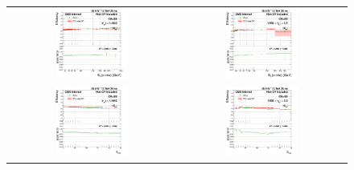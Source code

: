 \begin{figure}[bh]
  \begin{center}
    \begin{tabular}{cc}
      \includegraphics[width=0.45\textwidth]{figures/Zprime/2016/ScaleFactor/SameSign/N_1_eff/g_compare_cut_Et_Barrel_ea_ta_inc_AS_N_1_Dxy_PUW.png} &
      \includegraphics[width=0.45\textwidth]{figures/Zprime/2016/ScaleFactor/SameSign/N_1_eff/g_compare_cut_Et_Endcap_ea_ta_inc_AS_N_1_Dxy_PUW.png} \\
      \includegraphics[width=0.45\textwidth]{figures/Zprime/2016/ScaleFactor/SameSign/N_1_eff/g_compare_cut_nVtx_Barrel_ea_ta_inc_AS_N_1_Dxy_PUW.png} &
      \includegraphics[width=0.45\textwidth]{figures/Zprime/2016/ScaleFactor/SameSign/N_1_eff/g_compare_cut_nVtx_Endcap_ea_ta_inc_AS_N_1_Dxy_PUW.png} \\

\end{tabular}
\end{center}
\end{figure}

